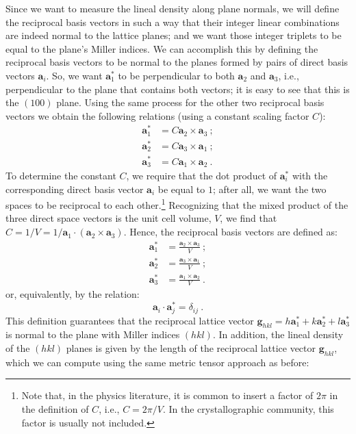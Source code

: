 Since we want to measure the lineal density along plane normals, we will define the reciprocal basis vectors in such a way that their integer linear combinations are indeed normal to the lattice planes; and we want those integer triplets to be equal to the plane's Miller indices.  We can accomplish this by defining the reciprocal basis vectors to be normal to the planes formed by pairs of direct basis vectors $\mathbf{a}_i$.  So, we want $\mathbf{a}^{\ast}_1$ to be perpendicular to both $\mathbf{a}_2$ and $\mathbf{a}_3$, i.e., perpendicular to the plane that contains both vectors; it is easy to see that this is the $(100)$ plane.  Using the same process for the other two reciprocal basis vectors we obtain the following relations (using a constant scaling factor $C$):
\begin{align*}
	\mathbf{a}^{\ast}_1 &= C \mathbf{a}_2\times\mathbf{a}_3 \ ;\\
	\mathbf{a}^{\ast}_2 &= C \mathbf{a}_3\times\mathbf{a}_1 \ ;\\
	\mathbf{a}^{\ast}_3 &= C \mathbf{a}_1\times\mathbf{a}_2 \ .	
\end{align*}
To determine the constant $C$, we require that the dot product of $\mathbf{a}_i^{\ast}$ with the corresponding direct basis vector $\mathbf{a}_i$ be equal to $1$; after all, we want the two spaces to be reciprocal to each other.\footnote{Note that, in the physics literature, it is common to insert a factor of $2\pi$ in the definition of $C$, i.e., $C=2\pi/V$.  In the crystallographic community, this factor is usually not included.} Recognizing that the mixed product of the three direct space vectors is the unit cell volume, $V$, we find that $C=1/V=1/\mathbf{a}_1\cdot(\mathbf{a}_2\times\mathbf{a}_3)$.  Hence, the reciprocal basis vectors are defined as:
\begin{align}
	\mathbf{a}^{\ast}_1 &= \frac{\mathbf{a}_2\times\mathbf{a}_3}{V} \ ;\nonumber\\
	\mathbf{a}^{\ast}_2 &= \frac{\mathbf{a}_3\times\mathbf{a}_1}{V} \ ;\\
	\mathbf{a}^{\ast}_3 &= \frac{\mathbf{a}_1\times\mathbf{a}_2}{V} \ .\nonumber	
\end{align}
or, equivalently, by the relation:
\begin{equation}
	\mathbf{a}_i\cdot\mathbf{a}^{\ast}_j = \delta_{ij} \ .\label{eq:rldef}
\end{equation}
This definition guarantees that the reciprocal lattice vector $\mathbf{g}_{hkl}=h\mathbf{a}_1^{\ast}+k\mathbf{a}_2^{\ast}+l\mathbf{a}_3^{\ast}$ is normal to the plane with Miller indices $(hkl)$.  In addition, the lineal density of the $(hkl)$ planes is given by the length of the reciprocal lattice vector $\mathbf{g}_{hkl}$, which we can compute using the same metric tensor approach as before:
